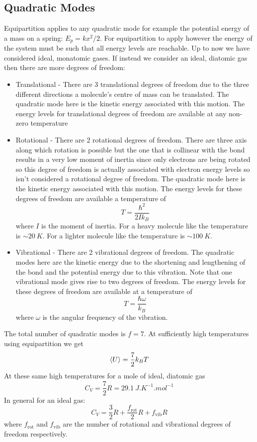 \documentclass{article}
\begin{document}
    \subsection{Quadratic Modes}
    Equipartition applies to any quadratic mode for example the potential energy of a mass on a spring: \(E_p = kx^2/2\).
    For equipartition to apply however the energy of the system must be such that all energy levels are reachable.
    Up to now we have considered ideal, monatomic gases.
    If instead we consider an ideal, diatomic gas then there are more degrees of freedom:
    \begin{itemize}
        \item Translational - There are 3 translational degrees of freedom due to the three different directions a molecule's centre of mass can be translated.
        The quadratic mode here is the kinetic energy associated with this motion.
        The energy levels for translational degrees of freedom are available at any non-zero temperature
        \item Rotational - There are 2 rotational degrees of freedom.
        There are three axis along which rotation is possible but the one that is collinear with the bond results in a very low moment of inertia since only electrons are being rotated so this degree of freedom is actually associated with electron energy levels so isn't considered a rotational degree of freedom.
        The quadratic mode here is the kinetic energy associated with this motion.
        The energy levels for these degrees of freedom are available a temperature of
        \[T = \frac{\hbar^2}{2Ik_B}\]
        where \(I\) is the moment of inertia.
        For a heavy molecule like  the temperature is \(\sim\SI{20}{K}\).
        For a lighter molecule like  the temperature is \(\sim\SI{100}{K}\).
        \item Vibrational - There are 2 vibrational degrees of freedom.
        The quadratic modes here are the kinetic energy due to the shortening and lengthening of the bond and the potential energy due to this vibration.
        Note that one vibrational mode gives rise to two degrees of freedom.
        The energy levels for these degrees of freedom are available at a temperature of
        \[T = \frac{\hbar\omega}{k_B}\]
        where \(\omega\) is the angular frequency of the vibration.
    \end{itemize}
    The total number of quadratic modes is \(f = 7\).
    At sufficiently high temperatures using equipartition we get
    \[\left\langle{U}\right\rangle = \frac{7}{2}k_BT\]
    At these same high temperatures for a mole of ideal, diatomic gas
    \[C_V = \frac{7}{2}R = \SI{29.1}{J.K^{-1}.mol^{-1}}\]
    In general for an ideal gas:
    \[C_V = \frac{3}{2}R + \frac{f_\text{rot}}{2}R +  f_\text{vib}R\]
    where \(f_\text{rot}\) and \(f_\text{vib}\) are the number of rotational and vibrational degrees of freedom respectively.
    
\end{document}
